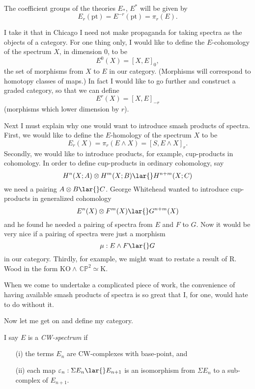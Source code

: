 \documentclass[../main]{subfiles}
\begin{document}
The coefficient groups of the theories $E_\ast$, $E^\ast$ will be given by
\[
E_r(\mathrm{pt})=E^{-r}(\mathrm{pt})=\pi_r(E).
\]

I take it that in Chicago I need not make propaganda for taking spectra as the objects of a category. For one thing only, I would like to define the $E$-cohomology of the spectrum $X$, in dimension 0, to be
\[
E^0(X)=[X,E]_0, %
\]
the set of morphisms from $X$ to $E$ in our category. (Morphisms will correspond to homotopy classes of maps.) In fact I would like to go further and construct a graded category, so that we can define
\[
E^r(X) = [X,E]_{-r}
\]
(morphisms which lower dimension by $r$).

Next I must explain why one would want to introduce smash products of spectra. First, we would like to define the $E$-homology of the spectrum $X$ to be
\[
E_r(X)=\pi_r(E\wedge X)=[S,E\wedge X]_r.
\]
Secondly, we would like to introduce products, for example, cup-products in cohomology. In order to define cup-products in ordinary cohomology, say
\[
H^n(X;A) \otimes H^m(X;B)
\lar{}
H^{n+m}(X;C)
\]
we need a pairing $A\otimes B \lar{} C$. George Whitehead wanted to introduce cup-products in generalized cohomology
\[
E^n(X) \otimes F^m(X)
\lar{}
G^{n+m}(X)
\]
and he found he needed a pairing of spectra from $E$ and $F$ to $G$. Now it would be very nice if a pairing of spectra were just a morphism
\[
\mu: E\wedge F \lar{} G
\]
in our category. Thirdly, for example, we might want to restate a result of R. Wood in the form $\mathrm{KO}\wedge\, \mathbb{CP}^2 \simeq \mathrm{K}$.

When we come to undertake a complicated piece of work, the convenience of having available smash products of spectra is so great that I, for one, would hate to do without it.

Now let me get on and define my category.

I say $E$ is a \emph{CW-spectrum} if
    \begin{enumerate}
    \item[(i)]  the terms $E_n$ are CW-complexes with base-point, and
    \item[(ii)] each map $\varepsilon_n: \Sigma   E_n \lar{} E_{n+1}$ is an isomorphism from $\Sigma   E_n$ to a sub-complex of $E_{n+1}$.
    \end{enumerate}
\end{document}

